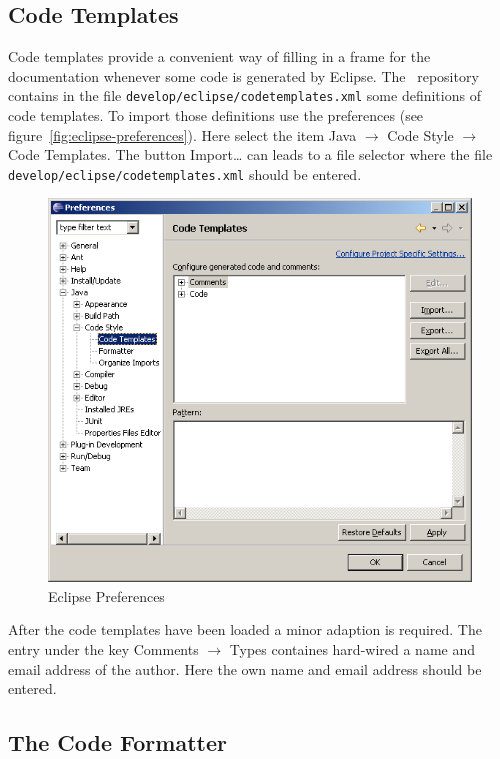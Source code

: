 \documentclass{extex-doc}
\newcommand\menu{\textsf}
\newcommand\sub{\(\rightarrow\) }
\newcommand\File[1]{\texttt{#1}}
\begin{document}
\subsection{Code Templates}

Code templates provide a convenient way of filling in a frame for the
documentation whenever some code is generated by Eclipse. The \ExTeX\ 
repository contains in the file
\File{develop/eclipse/codetemplates.xml} some definitions of code
templates. To import those definitions use the preferences (see
figure~\ref{fig:eclipse-preferences}). Here select the item \menu{Java
  \sub Code Style \sub Code Templates}. The button \menu{Import\ldots}
can leads to a file selector where the file
\File{develop/eclipse/codetemplates.xml} should be entered.
\begin{figure}[ht]
  \centering  \includegraphics[scale=.4]{image/eclipse-templates}
  \caption{Eclipse Preferences}\label{fig:eclipse-templates}
\end{figure}

After the code templates have been loaded a minor adaption is
required. The entry under the key \menu{Comments \sub Types} containes
hard-wired a name and email address of the author. Here the own name
and email address should be entered.


\subsection{The Code Formatter}
\end{document}
